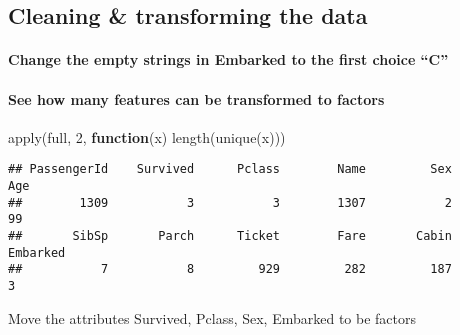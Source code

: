 \documentclass[
]{article}
\newenvironment{Shaded}{\begin{snugshade}}{\end{snugshade}}
\newcommand{\ControlFlowTok}[1]{\textcolor[rgb]{0.13,0.29,0.53}{\textbf{#1}}}
\newcommand{\DecValTok}[1]{\textcolor[rgb]{0.00,0.00,0.81}{#1}}
\newcommand{\FunctionTok}[1]{\textcolor[rgb]{0.00,0.00,0.00}{#1}}
\newcommand{\NormalTok}[1]{#1}
\newcommand{\OtherTok}[1]{\textcolor[rgb]{0.56,0.35,0.01}{#1}}
\newcommand{\SpecialCharTok}[1]{\textcolor[rgb]{0.00,0.00,0.00}{#1}}
\newcommand{\StringTok}[1]{\textcolor[rgb]{0.31,0.60,0.02}{#1}}
\begin{document}
\hypertarget{cleaning-transforming-the-data}{%
\subsection{Cleaning \& transforming the
data}\label{cleaning-transforming-the-data}}

\hypertarget{change-the-empty-strings-in-embarked-to-the-first-choice-c}{%
\paragraph{Change the empty strings in Embarked to the first choice
``C''}\label{change-the-empty-strings-in-embarked-to-the-first-choice-c}}

\begin{Shaded}
\end{Shaded}

\hypertarget{see-how-many-features-can-be-transformed-to-factors}{%
\paragraph{See how many features can be transformed to
factors}\label{see-how-many-features-can-be-transformed-to-factors}}

\begin{Shaded}
\begin{Highlighting}[]
\FunctionTok{apply}\NormalTok{(full, }\DecValTok{2}\NormalTok{, }\ControlFlowTok{function}\NormalTok{(x) }\FunctionTok{length}\NormalTok{(}\FunctionTok{unique}\NormalTok{(x)))}
\end{Highlighting}
\end{Shaded}

\begin{verbatim}
## PassengerId    Survived      Pclass        Name         Sex         Age 
##        1309           3           3        1307           2          99 
##       SibSp       Parch      Ticket        Fare       Cabin    Embarked 
##           7           8         929         282         187           3
\end{verbatim}

Move the attributes Survived, Pclass, Sex, Embarked to be factors
\end{document}
